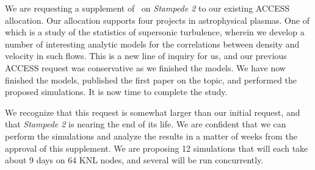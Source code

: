 
We are requesting a supplement of \request\ on \emph{Stampede 2} to our existing ACCESS allocation.
Our allocation supports four projects in astrophysical plasmas. One of which is
a study of the statistics of supersonic turbulence, wherein we develop a number
of interesting analytic models for the correlations between density and
velocity in such flows.  This is a new line of inquiry for us, and our previous
ACCESS request was conservative as we finished the models.  We have now finished
the models, published the first paper on the topic, and performed the proposed
simulations.  It is now time to complete the study.

We recognize that this request is somewhat larger than our initial request, and
that \emph{Stampede 2} is nearing the end of its life.   We are confident that
we can perform the simulations and analyze the results in a matter of weeks from
the approval of this supplement.   We are proposing 12 simulations that will
each take about 9 days on 64 KNL nodes, and several will be run concurrently.


